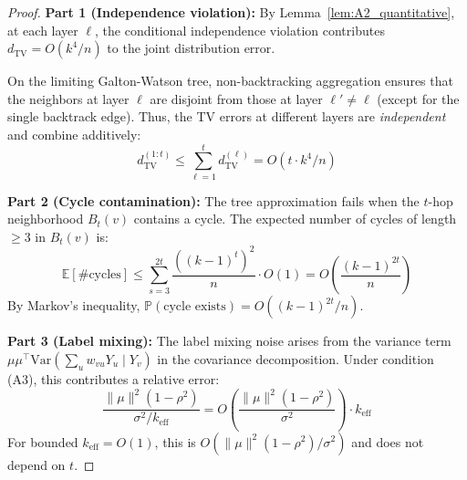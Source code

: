 \begin{proof}
\textbf{Part 1 (Independence violation):}
By Lemma~\ref{lem:A2_quantitative}, at each layer $\ell$, the conditional independence violation contributes $d_{\mathrm{TV}} = O(k^4/n)$ to the joint distribution error.

On the limiting Galton-Watson tree, non-backtracking aggregation ensures that the neighbors at layer $\ell$ are disjoint from those at layer $\ell' \neq \ell$ (except for the single backtrack edge). Thus, the TV errors at different layers are \textit{independent} and combine additively:
\begin{equation}
    d_{\mathrm{TV}}^{(1:t)} \leq \sum_{\ell=1}^t d_{\mathrm{TV}}^{(\ell)} = O(t \cdot k^4/n)
\end{equation}

\textbf{Part 2 (Cycle contamination):}
The tree approximation fails when the $t$-hop neighborhood $B_t(v)$ contains a cycle. The expected number of cycles of length $\geq 3$ in $B_t(v)$ is:
\begin{equation}
    \mathbb{E}[\#\text{cycles}] \leq \sum_{s=3}^{2t} \frac{((k-1)^t)^2}{n} \cdot O(1) = O\left(\frac{(k-1)^{2t}}{n}\right)
\end{equation}
By Markov's inequality, $\mathbb{P}(\text{cycle exists}) = O((k-1)^{2t}/n)$.

\textbf{Part 3 (Label mixing):}
The label mixing noise arises from the variance term $\mu\mu^\top \mathrm{Var}(\sum_u w_{vu} Y_u \mid Y_v)$ in the covariance decomposition. Under condition (A3), this contributes a relative error:
\begin{equation}
    \frac{\|\mu\|^2 (1-\rho^2)}{\sigma^2 / k_{\mathrm{eff}}} = O\left(\frac{\|\mu\|^2 (1-\rho^2)}{\sigma^2}\right) \cdot k_{\mathrm{eff}}
\end{equation}
For bounded $k_{\mathrm{eff}} = O(1)$, this is $O(\|\mu\|^2(1-\rho^2)/\sigma^2)$ and does not depend on $t$.
\end{proof}


